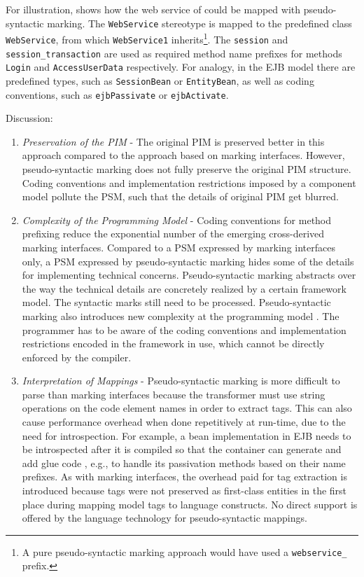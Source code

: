 For illustration,  shows how the web service of  could be mapped with pseudo-syntactic marking.
The {\tt \flqq Web\-Ser\-vi\-ce\frqq} stereotype is mapped to the predefined class {\tt WebService}, from which {\tt Web\-Ser\-vi\-ce1} inherits\footnote{A pure pseudo-syntactic marking approach would have used a \texttt{webservice\_} prefix.}. The \texttt{se\-ssion} and \texttt{se\-ssion\_tran\-sac\-tion} are used as required method name prefixes for methods {\tt Lo\-gin} and {\tt Access\-User\-Da\-ta} respectively. 
For analogy, in the EJB \cite{www.j2ee} model there are predefined types, such as {\tt SessionBean} or {\tt EntityBean}, as well as coding conventions, such as  \texttt{ejb\-Passi\-va\-te} or {\tt ejb\-Acti\-va\-te}.

\noindent Discussion:
\begin{enumerate}
\item \textit{Preservation of the PIM} - The original PIM is preserved better in this approach compared to the approach based on marking interfaces. 
However, pseudo-syntactic marking does not fully preserve the original PIM structure. Coding conventions and implementation restrictions imposed by a component model pollute the PSM, such that the details of original PIM get blurred. 

\item \textit{Complexity of the Programming Model} - Coding conventions for method prefixing reduce the exponential number of the emerging cross-derived marking interfaces. Compared to a PSM expressed by marking interfaces only, a PSM expressed by pseudo-syntactic marking hides some of the details for implementing technical concerns.  Pseudo-syntactic marking abstracts over the way the technical details are concretely realized by a certain framework model. The syntactic marks still need to be processed. Pseudo-syntactic marking also introduces new complexity at the programming model \cite{aspectComp.03}. The programmer has to be aware of the coding conventions and implementation restrictions encoded in the framework in use, which cannot be directly enforced by the compiler.

\item \textit{Interpretation of Mappings} - Pseudo-syntactic marking is more difficult to parse than marking interfaces because the transformer must use string operations on the code element names in order to extract tags. This can also cause performance overhead when done repetitively at run-time, due to the need for introspection. For example, a bean implementation in EJB needs to be introspected after it is compiled so that the container can generate and add glue code \cite{halloway.02}, e.g., to handle its passivation methods based on their name prefixes. 
As with marking interfaces, the overhead paid for tag extraction is introduced because tags were not preserved as first-class entities in the first place during mapping model tags to language constructs. No direct support is offered by the language technology for pseudo-syntactic mappings.


\end{enumerate}
